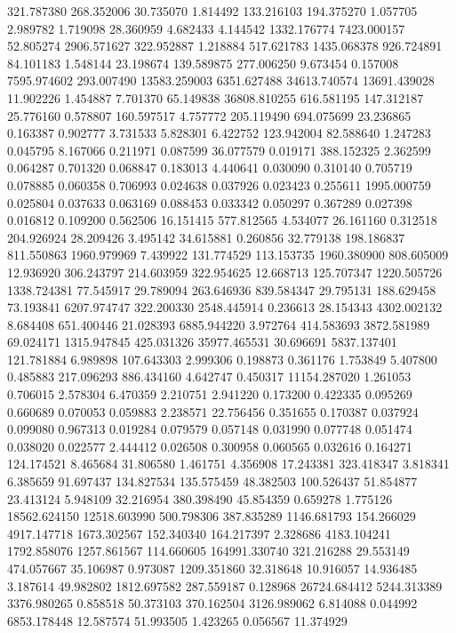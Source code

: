 321.787380
268.352006
30.735070
1.814492
133.216103
194.375270
1.057705
2.989782
1.719098
28.360959
4.682433
4.144542
1332.176774
7423.000157
52.805274
2906.571627
322.952887
1.218884
517.621783
1435.068378
926.724891
84.101183
1.548144
23.198674
139.589875
277.006250
9.673454
0.157008
7595.974602
293.007490
13583.259003
6351.627488
34613.740574
13691.439028
11.902226
1.454887
7.701370
65.149838
36808.810255
616.581195
147.312187
25.776160
0.578807
160.597517
4.757772
205.119490
694.075699
23.236865
0.163387
0.902777
3.731533
5.828301
6.422752
123.942004
82.588640
1.247283
0.045795
8.167066
0.211971
0.087599
36.077579
0.019171
388.152325
2.362599
0.064287
0.701320
0.068847
0.183013
4.440641
0.030090
0.310140
0.705719
0.078885
0.060358
0.706993
0.024638
0.037926
0.023423
0.255611
1995.000759
0.025804
0.037633
0.063169
0.088453
0.033342
0.050297
0.367289
0.027398
0.016812
0.109200
0.562506
16.151415
577.812565
4.534077
26.161160
0.312518
204.926924
28.209426
3.495142
34.615881
0.260856
32.779138
198.186837
811.550863
1960.979969
7.439922
131.774529
113.153735
1960.380900
808.605009
12.936920
306.243797
214.603959
322.954625
12.668713
125.707347
1220.505726
1338.724381
77.545917
29.789094
263.646936
839.584347
29.795131
188.629458
73.193841
6207.974747
322.200330
2548.445914
0.236613
28.154343
4302.002132
8.684408
651.400446
21.028393
6885.944220
3.972764
414.583693
3872.581989
69.024171
1315.947845
425.031326
35977.465531
30.696691
5837.137401
121.781884
6.989898
107.643303
2.999306
0.198873
0.361176
1.753849
5.407800
0.485883
217.096293
886.434160
4.642747
0.450317
11154.287020
1.261053
0.706015
2.578304
6.470359
2.210751
2.941220
0.173200
0.422335
0.095269
0.660689
0.070053
0.059883
2.238571
22.756456
0.351655
0.170387
0.037924
0.099080
0.967313
0.019284
0.079579
0.057148
0.031990
0.077748
0.051474
0.038020
0.022577
2.444412
0.026508
0.300958
0.060565
0.032616
0.164271
124.174521
8.465684
31.806580
1.461751
4.356908
17.243381
323.418347
3.818341
6.385659
91.697437
134.827534
135.575459
48.382503
100.526437
51.854877
23.413124
5.948109
32.216954
380.398490
45.854359
0.659278
1.775126
18562.624150
12518.603990
500.798306
387.835289
1146.681793
154.266029
4917.147718
1673.302567
152.340340
164.217397
2.328686
4183.104241
1792.858076
1257.861567
114.660605
164991.330740
321.216288
29.553149
474.057667
35.106987
0.973087
1209.351860
32.318648
10.916057
14.936485
3.187614
49.982802
1812.697582
287.559187
0.128968
26724.684412
5244.313389
3376.980265
0.858518
50.373103
370.162504
3126.989062
6.814088
0.044992
6853.178448
12.587574
51.993505
1.423265
0.056567
11.374929
